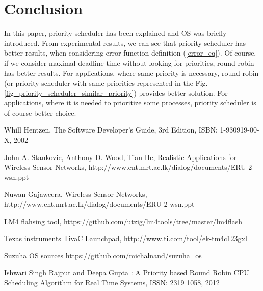 \documentclass[a4paper, conference]{IEEEtran}
\begin{document}
\section{Conclusion}
In this paper, priority scheduler has been explained and OS was briefly introduced. From experimental results, we can see that priority scheduler has better results, when considering error function definition (\ref{error_eq}). Of course, if we consider maximal deadline time without looking for priorities, round robin has better results. For applications, where same priority is necessary, round robin (or priority scheduler with same priorities represented in the Fig. \ref{fig_priority_scheduler_similar_priority}) provides better solution. For applications, where it is needed to prioritize some processes, priority scheduler is of course better choice.



\balance

 
\begin{thebibliography}{99}

 Whill Hentzen, The Software Developer's Guide, 3rd Edition, ISBN: 1-930919-00-X, 2002


 John A. Stankovic, Anthony D. Wood, Tian He, Realistic Applications for Wireless Sensor Networks, http://www.ent.mrt.ac.lk/dialog/documents/ERU-2-wsn.ppt

 Nuwan Gajaweera, Wireless Sensor Networks, http://www.ent.mrt.ac.lk/dialog/documents/ERU-2-wsn.ppt

 LM4 flahsing tool, https://github.com/utzig/lm4tools/tree/master/lm4flash

 Texas instruments TivaC Launchpad, http://www.ti.com/tool/ek-tm4c123gxl

Suzuha OS sources https://github.com/michalnand/suzuha\_os

 Ishwari Singh Rajput and Deepa Gupta : A Priority based Round Robin CPU Scheduling Algorithm for Real Time Systems, ISSN: 2319 1058, 2012


\end{thebibliography}
\end{document}
